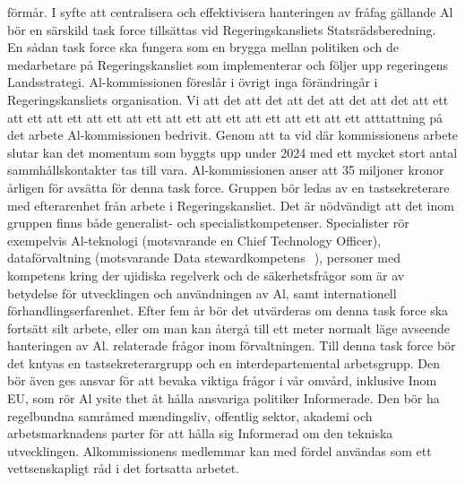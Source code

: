 förmår. I syfte att centralisera och effektivisera hanteringen av fråfag gällande Al bör en särskild task force tillsättas vid Regeringskansliets Statsrädsberedning. \({ }^{}\) En sådan task force ska fungera som en brygga mellan politiken och de medarbetare på Regeringskansliet som implementerar och följer upp regeringens Landsstrategi. Al-kommissionen föreslår i övrigt inga förändringår i Regeringskansliets organisation. Vi att det att det att det att det att det att ett att ett att ett att ett att ett att ett att ett att ett att ett att ett atttattning på det arbete Al-kommissionen bedrivit. Genom att ta vid där kommissionens arbete slutar kan det momentum som byggts upp under 2024 med ett mycket stort antal sammhållskontakter tas till vara. Al-kommissionen anser att 35 miljoner kronor årligen för avsätta för denna task force.
Gruppen bör ledas av en tastsekreterare med efterarenhet från arbete i Regeringskansliet. Det är nödvändigt att det inom gruppen finns både generalist- och specialistkompetenser. Specialister rör exempelvis Al-teknologi (motsvarande en Chief Technology Officer), dataförvaltning (motsvarande Data stewardkompetens \({ }^{}\) ), personer med kompetens kring der ujidiska regelverk och de säkerhetsfrågor som är av betydelse för utvecklingen och användningen av Al, samt internationell förhandlingserfarenhet. Efter fem år bör det utvärderas om denna task force ska fortsätt silt arbete, eller om man kan återgå till ett meter normalt läge avseende hanteringen av Al. relaterade frågor inom förvaltningen.
Till denna task force bör det kntyas en tastsekreterargrupp och en interdepartemental arbetsgrupp. Den bör även ges ansvar för att bevaka viktiga frågor i vår omvård, inklusive Inom EU, som rör Al ysite thet åt hålla ansvariga politiker Informerade. Den bör ha regelbundna samråmed mændingsliv, offentlig sektor, akademi och arbetsmarknadens parter för att hålla sig Informerad om den tekniska utvecklingen. Alkommissionens medlemmar kan med fördel användas som ett vettsenskapligt råd i det fortsatta arbetet.
